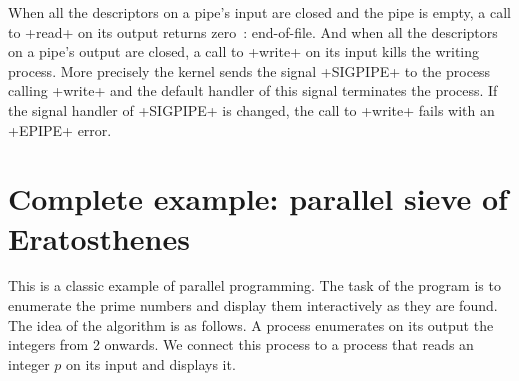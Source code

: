 When all the descriptors on a pipe's input are closed and the pipe is
empty, a call to \ml+read+ on its output returns zero~:
end-of-file. And when all the descriptors on a pipe's output are
closed, a call to \ml+write+ on its input kills the writing
process. More precisely the kernel sends the signal \ml+SIGPIPE+ to
the process calling \ml+write+ and the default handler of this signal
terminates the process. If the signal handler of \ml+SIGPIPE+ is
changed, the call to \ml+write+ fails with an \ml+EPIPE+ error.

\section{Complete example: parallel sieve of Eratosthenes}
\label{ex/crible}

This is a classic example of parallel programming. The task of the
program is to enumerate the prime numbers and display them
interactively as they are found. The idea of the algorithm is as
follows. A process enumerates on its output the integers from 2 onwards. We
connect this process to a  process that reads an
integer $p$ on its input and displays it.


